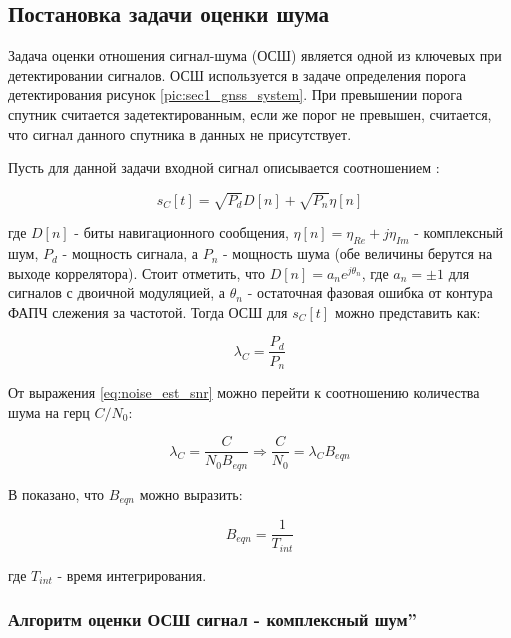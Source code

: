 \subsection{Постановка задачи оценки шума}
\label{sec1_noise_est}

Задача оценки отношения сигнал-шума (ОСШ) является одной из ключевых при детектировании сигналов.
ОСШ используется в задаче определения порога детектирования рисунок \ref{pic:sec1_gnss_system}.
При превышении порога спутник считается задетектированным, если же порог
не превышен, считается, что сигнал данного спутника в данных не присутствует.

Пусть для данной задачи входной сигнал описывается соотношением \cite{presti_ieee}:
\begin{center}
\begin{equation}
	\label{eq:noise_est_signal}
	s_C[t]=\sqrt{P_d}D[n] + \sqrt{P_n}\eta[n]
\end{equation}
\end{center}
где $D[n]$ - биты навигационного сообщения, $\eta[n]=\eta_{Re} + j\eta_{Im}$ - комплексный шум,
$P_d$ - мощность сигнала, а $P_n$ - мощность шума (обе величины берутся на выходе коррелятора).
Стоит отметить, что $D[n]=a_{n}e^{j\theta_n}$, где $a_n=\pm{1}$ для сигналов с двоичной модуляцией, а
$\theta_n$ - остаточная фазовая ошибка от контура ФАПЧ слежения за частотой.
Тогда ОСШ для $s_C[t]$ можно представить как:
\begin{center}
\begin{equation}
	\label{eq:noise_est_snr}
	\lambda_C=\frac{P_d}{P_n}
\end{equation}
\end{center}
От выражения \ref{eq:noise_est_snr} можно перейти к соотношению количества шума на герц $C/N_0$:
\begin{center}
\begin{equation}
	\label{eq:noise_est_cn}
	\lambda_C=\frac{C}{N_{0}B_{eqn}}\Rightarrow\frac{C}{N_0}=\lambda_{C}B_{eqn}
\end{equation}
\end{center}
В \cite{presti_ieee} показано, что $B_{eqn}$ можно выразить:
\begin{center}
\begin{equation}
	\label{eq:noise_est_beqn}
	B_{eqn}=\frac{1}{T_{int}}
\end{equation}
\end{center}
где ${T_{int}}$ - время интегрирования.

\subsubsection{Алгоритм оценки ОСШ
 сигнал - комплексный шум\textquotedblright}

